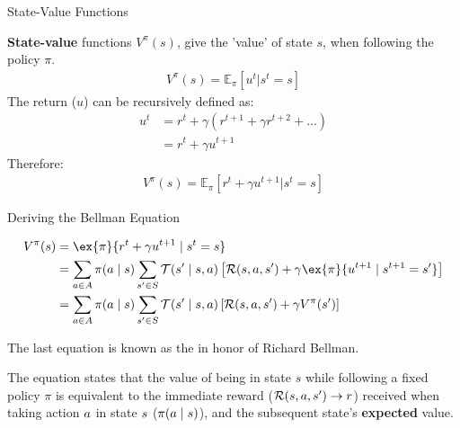 \begin{frame}{State-Value Functions}

    \textbf{State-value} functions $V^{\pi}(s)$, give the 'value' of state $s$, when following the policy $\pi$. 
    \vspace{0pt}
    \begin{align*}
    V^{\pi}(s) = \mathbb{E}_\pi \left[u^{t} | s^{t} = s \right]
    \end{align*}
    \vspace{0pt}
    The return ($u$) can be recursively defined as:
    \vspace{0pt}
    \begin{align*}
            u^t &= r^t +\gamma (r^{t+1} + \gamma r^{t+2} + ... )  \\ &= r^t + \gamma u^{t+1}
    \end{align*}
    \vspace{0pt}   
    Therefore:
    \vspace{0pt}
    \begin{align*}
        V^{\pi}(s) = \mathbb{E}_\pi \left[r^t + \gamma u^{t+1}| s^{t} = s \right]
    \end{align*}
    \vspace{5pt}
\end{frame}

\begin{frame}[t]{Deriving the Bellman Equation}

    \begin{align*}
        V^{\pi}(\st) &= \ex{\pi}{\rew^t + \gamma u^{t+1} \mid \st^{t} = \st } \\ 
                   &= \sum_{\ac \in \Ac} \pi(\ac \mid \st) \sum_{\st' \in \St} \Stf(\st'\mid \st, \ac) \left[\Rew(\st, \ac, \st') + \gamma \ex{\pi}{u^{t+1} \mid \st^{t+1} = \st'}\right] \\
                   &= \sum_{\ac \in \Ac} \pi(\ac \mid \st) \sum_{\st' \in \St} \Stf(\st'\mid \st, \ac) \left[\Rew(\st, \ac, \st') + \gamma V^{\pi}(\st')\right]
    \end{align*}
    
    The last equation is known as the  in honor of Richard Bellman. 
    
    \blist
        \item The equation states that the value of being in state $s$ while following a fixed policy $\pi$ is equivalent to the immediate reward ($\mathcal{R}(s, a, s') \to r$) received when taking action $a$ in state $s$ ($\pi(a \mid s)$), and the subsequent state's \textbf{expected} value. 
    \elist
\end{frame}

